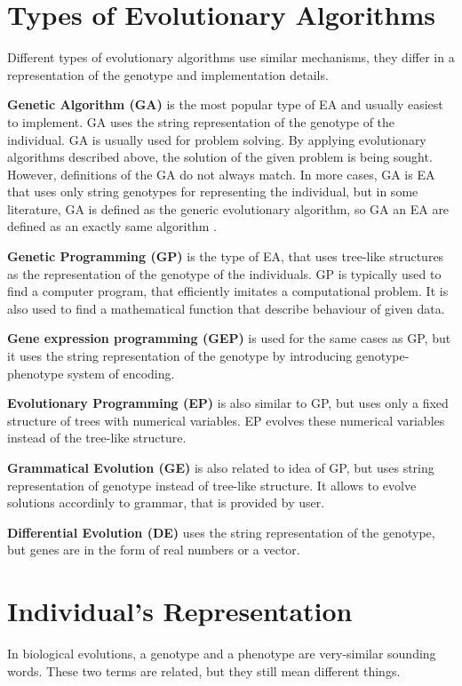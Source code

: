 
\section{Types of Evolutionary Algorithms}

Different types of evolutionary algorithms use similar mechanisms, they differ in a representation of the genotype and implementation details.

\textbf{Genetic Algorithm (GA)} is the most popular type of EA and usually easiest to implement. GA uses the string representation of the genotype of the individual. GA is usually used for problem solving. By applying evolutionary algorithms described above, the solution of the given problem is being sought. However, definitions of the GA do not always match. In more cases, GA is EA that uses only string genotypes for representing the individual, but in some literature, GA is defined as the generic evolutionary algorithm, so GA an EA are defined as an exactly same algorithm \cite{evolutionary-algorithms}.

\textbf{Genetic Programming (GP)} is the type of EA, that uses tree-like structures as the representation of the genotype of the individuals. GP is typically used to find a computer program, that efficiently imitates a computational problem. It is also used to find a mathematical function that describe behaviour of given data.

\textbf{Gene expression programming (GEP)} is used for the same cases as GP, but it uses the string representation of the genotype by introducing genotype-phenotype system of encoding.

\textbf{Evolutionary Programming (EP)} is also similar to GP, but uses only a fixed structure of trees with numerical variables. EP evolves these numerical variables instead of the tree-like structure.

\textbf{Grammatical Evolution (GE)} is also related to idea of GP, but uses string representation of genotype instead of tree-like structure. It allows to evolve solutions accordinly to grammar, that is provided by user.

\textbf{Differential Evolution (DE)} uses the string representation of the genotype, but genes are in the form of real numbers or a vector.

\section{Individual's Representation}
In biological evolutions, a genotype and a phenotype are very-similar sounding words. These two terms are related, but they still mean different things.

